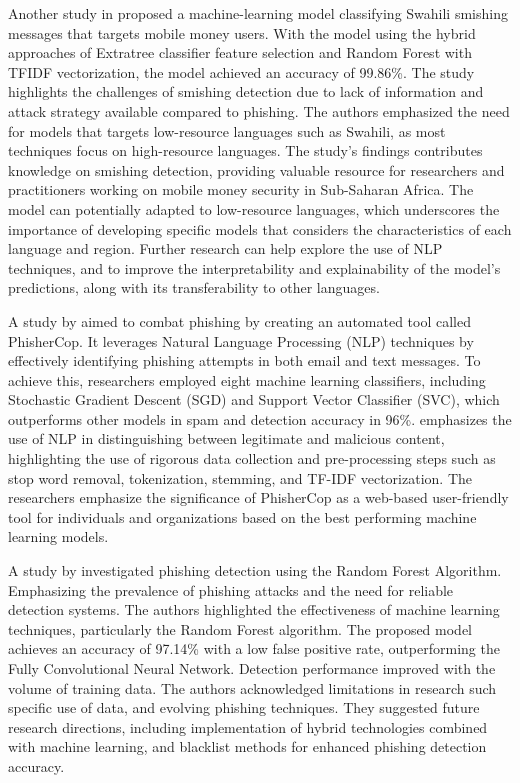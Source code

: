 \documentclass[conference]{IEEEtran}
\begin{document}
Another study in \cite{mambina2022} proposed a machine-learning model classifying Swahili smishing messages that targets mobile money users. With the model using the hybrid approaches of Extratree classifier feature  selection and Random Forest with TFIDF vectorization, the model achieved an accuracy of 99.86\%. The study highlights the challenges of smishing detection due to lack of information and attack strategy available compared to phishing. The authors emphasized the need for models that targets low-resource languages such as Swahili, as most techniques focus on high-resource languages. The study's findings contributes knowledge on smishing detection, providing valuable resource for researchers and practitioners working on mobile money security in Sub-Saharan Africa. The model can potentially adapted to low-resource languages, which underscores the importance of developing specific models that considers the characteristics of each language and region. Further research can help explore the use of NLP techniques, and to improve the interpretability and explainability of the model's predictions, along with its transferability to other languages.

A study by \cite{noah2022} aimed to combat phishing by creating an automated tool called PhisherCop. It leverages Natural Language Processing (NLP) techniques by effectively identifying phishing attempts in both email and text messages. To achieve this, researchers employed eight machine learning classifiers, including Stochastic Gradient Descent (SGD) and Support Vector Classifier (SVC), which outperforms other models in spam and detection accuracy in 96\%. \cite{noah2022} emphasizes the use of NLP in distinguishing between legitimate and malicious content, highlighting the use of rigorous data collection and pre-processing steps such as stop word removal, tokenization, stemming, and TF-IDF vectorization. The researchers emphasize the significance of PhisherCop as a web-based user-friendly tool for individuals and organizations based on the best performing machine learning models.

A study by \cite{sathya2020} investigated phishing detection using the Random Forest Algorithm. Emphasizing the prevalence of phishing attacks and the need for reliable detection systems.  The authors highlighted the effectiveness of machine learning techniques, particularly the Random Forest algorithm. The proposed model achieves an accuracy of 97.14\% with a low false positive rate, outperforming the Fully Convolutional Neural Network. Detection performance improved with the volume of training data. The authors acknowledged limitations in research such specific use of data, and evolving phishing techniques. They suggested future research directions, including implementation of hybrid technologies combined with machine learning, and blacklist methods for enhanced phishing detection accuracy.
\end{document}
